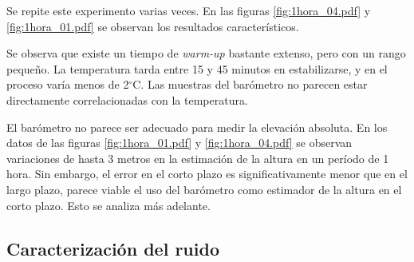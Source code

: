 \documentclass[main]{subfiles}
\newcommand{\degc}{$^\circ$C}
\begin{document}
Se repite este experimento varias veces. En las figuras \ref{fig:1hora_04.pdf} y \ref{fig:1hora_01.pdf} se observan los resultados característicos.

\begin{figure}[h!]
\hspace{-50pt}
\caption{}
\end{figure}
\vspace{-10pt}

Se observa que existe un tiempo de \textit{warm-up} bastante extenso, pero con un rango pequeño. La temperatura tarda entre 15 y 45 minutos en estabilizarse, y en el proceso varía menos de 2\degc. Las muestras del barómetro no parecen estar directamente correlacionadas con la temperatura.

El barómetro no parece ser adecuado para medir la elevación absoluta. En los datos de las figuras \ref{fig:1hora_01.pdf} y \ref{fig:1hora_04.pdf} se observan variaciones de hasta 3 metros en la estimación de la altura en un período de 1 hora. Sin embargo, el error en el corto plazo es significativamente menor que en el largo plazo, parece viable el uso del barómetro como estimador de la altura en el corto plazo. Esto se analiza más adelante.

\subsection{Caracterización del ruido}
\label{sec:caract-ruido}
\end{document}
